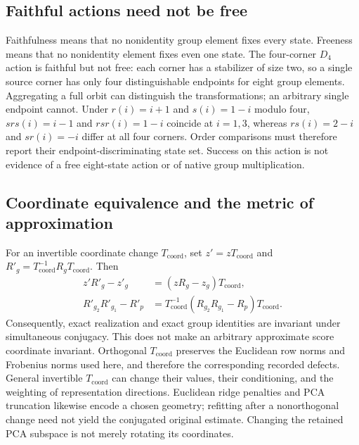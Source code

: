 \subsection{Faithful actions need not be free}
\label{app:faithful-not-free}
Faithfulness means that no nonidentity group element fixes every state. Freeness means that no nonidentity element fixes even one state. The four-corner $D_4$ action is faithful but not free: each corner has a stabilizer of size two, so a single source corner has only four distinguishable endpoints for eight group elements. Aggregating a full orbit can distinguish the transformations; an arbitrary single endpoint cannot. Under $r(i)=i+1$ and $s(i)=1-i$ modulo four, $srs(i)=i-1$ and $rsr(i)=1-i$ coincide at $i=1,3$, whereas $rs(i)=2-i$ and $sr(i)=-i$ differ at all four corners. Order comparisons must therefore report their endpoint-discriminating state set. Success on this action is not evidence of a free eight-state action or of native group multiplication.

\subsection{Coordinate equivalence and the metric of approximation}
\label{app:coordinates}
For an invertible coordinate change $T_{\mathrm{coord}}$, set $z'=zT_{\mathrm{coord}}$ and $R'_g=T_{\mathrm{coord}}^{-1}R_gT_{\mathrm{coord}}$. Then
\[
\begin{aligned}
 z'R'_g-z'_{g}&=(zR_g-z_g)T_{\mathrm{coord}},\\
 R'_{g_2}R'_{g_1}-R'_{p}
 &=T_{\mathrm{coord}}^{-1}(R_{g_2}R_{g_1}-R_p)T_{\mathrm{coord}}.
\end{aligned}
\]
Consequently, exact realization and exact group identities are invariant under simultaneous conjugacy. This does not make an arbitrary approximate score coordinate invariant. Orthogonal $T_{\mathrm{coord}}$ preserves the Euclidean row norms and Frobenius norms used here, and therefore the corresponding recorded defects. General invertible $T_{\mathrm{coord}}$ can change their values, their conditioning, and the weighting of representation directions. Euclidean ridge penalties and PCA truncation likewise encode a chosen geometry; refitting after a nonorthogonal change need not yield the conjugated original estimate. Changing the retained PCA subspace is not merely rotating its coordinates.

